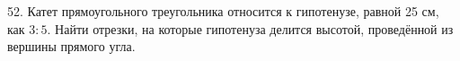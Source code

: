 52. Катет прямоугольного треугольника относится к гипотенузе, равной 25 см, как $3:5.$ Найти отрезки, на которые гипотенуза делится высотой, проведённой из вершины прямого угла.\\
